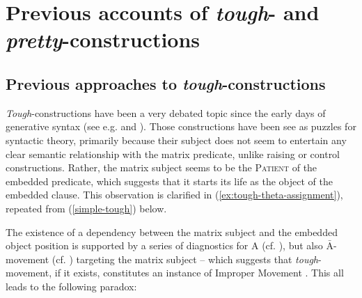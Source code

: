 \documentclass[11pt]{article}
\newcommand{\Abar}{$\bar{\text{A}}$}
\begin{document}
\section{Previous accounts of \textit{tough}- and \textit{pretty}-constructions}\label{sec:previous-aproaches}
\subsection{Previous approaches to \textit{tough}-constructions}\label{app:2-camps}
\textit{Tough}-constructions have been a very debated topic since the early days of generative syntax (see e.g. \cite{Chomsky1964} and \cite{Rosenbaum1967}). Those constructions have been see as puzzles for syntactic theory, primarily because their subject does not seem to entertain any clear semantic relationship with the matrix predicate, unlike raising or control constructions. Rather, the matrix subject seems to be the \textsc{Patient} of the embedded predicate, which suggests that it starts its life as the object of the embedded clause. This observation is clarified in (\ref{ex:tough-theta-assignment}), repeated from (\ref{simple-tough}) below.
\begin{exe}
	\ex
	\begin{xlist}
		 \label{simple-tough}
	\end{xlist}\label{ex:tough-theta-assignment}
\end{exe}
The existence of a dependency between the matrix subject and the embedded object position is supported by a series of diagnostics for A (cf. \cite{Lasnik1991,Mulder1992,Ruys2000}), but also \Abar-movement (cf. \cite{Chomsky1977,Chomsky1982,Rezac2006}) targeting the matrix subject -- which suggests that \textit{tough}-movement, if it exists, constitutes an instance of Improper Movement \cite{Chomsky1986}. This all leads to the following paradox:\\

\begin{center}
\end{center}
\end{document}

